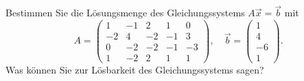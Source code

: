 \begin{ejercicio}
    Bestimmen Sie die Lösungsmenge des Gleichungssystems $A\vec{x} = \vec{b}$ mit
    \begin{equation*}
        A = \begin{pmatrix}
            1 & -1 & 2 & 1 & 0\\
            -2 & 4 & -2 & -1 & 3\\
            0 & -2 & -2 & -1 & -3\\
            1 & -2 & 2 & 1 & 1
        \end{pmatrix}, \quad \vec{b} = \begin{pmatrix}
            1\\
            4\\
            -6\\
            1
        \end{pmatrix}.
    \end{equation*}
    Was können Sie zur Lösbarkeit des Gleichungssystems sagen?
\end{ejercicio}